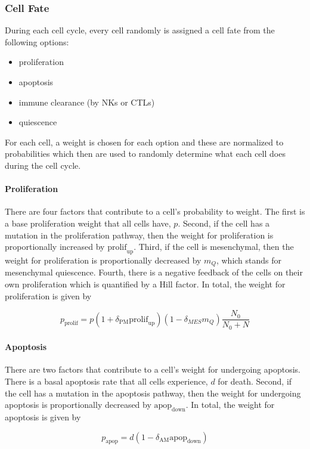 \documentclass{article}
\begin{document}
\subsubsection{Cell Fate}
During each cell cycle, every cell randomly is assigned a cell fate from the following options:
\begin{itemize}
\item proliferation
\item apoptosis
\item immune clearance (by NKs or CTLs)
\item quiescence
\end{itemize}

For each cell, a weight is chosen for each option and these are normalized to probabilities which then are used to randomly determine what each cell does during the cell cycle.

\paragraph{Proliferation}
There are four factors that contribute to a cell's probability to weight.
The first is a base proliferation weight that all cells have, $p$.
Second, if the cell has a mutation in the proliferation pathway, then the weight for proliferation is proportionally increased by $\text{prolif}_{\text{up}}$.
Third, if the cell is mesenchymal, then the weight for proliferation is proportionally decreased by $m_Q$, which stands for mesenchymal quiescence.
Fourth, there is a negative feedback of the cells on their own proliferation which is quantified by a Hill factor.
In total, the weight for proliferation is given by

$$ p_{\text{prolif}} = p(1+\delta_{\text{PM}}\text{prolif}_{\text{up}})(1-\delta_{MES}m_Q)\frac{N_0}{N_0+N} $$

\paragraph{Apoptosis}
There are two factors that contribute to a cell's weight for undergoing apoptosis.
There is a basal apoptosis rate that all cells experience, $d$ for death.
Second, if the cell has a mutation in the apoptosis pathway, then the weight for undergoing apoptosis is proportionally decreased by $\text{apop}_{\text{down}}$.
In total, the weight for apoptosis is given by 

$$ p_{\text{apop}} = d(1-\delta_{\text{AM}}\text{apop}_{\text{down}}) $$
\end{document}
